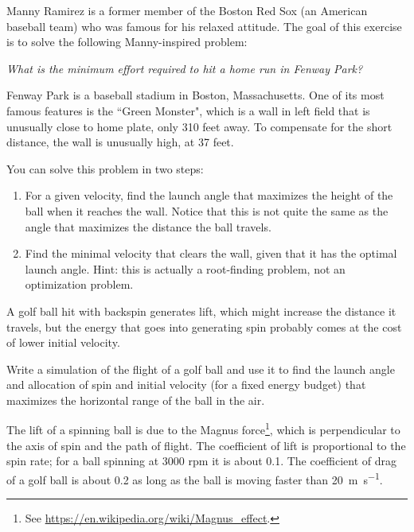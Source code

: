 \documentclass[
]{book}
\numberwithin{Answer}{chapter}
\numberwithin{Exercise}{chapter}
\begin{document}
\begin{ex}


Manny Ramirez is a former member of the Boston Red Sox (an American baseball team) who was famous for his relaxed attitude.  The goal of this exercise is to solve the following Manny-inspired problem:

{\it What is the minimum effort required to hit a home run in Fenway Park?}


Fenway Park is a baseball stadium in Boston, Massachusetts.  One of its most famous features is the ``Green Monster", which is a wall in left field that is unusually close to home plate, only 310 feet away.  To compensate for the short distance, the wall is unusually high, at 37 feet.


You can solve this problem in two steps:

\begin{enumerate}

\item For a given velocity, find the launch angle that maximizes the height of the ball when it reaches the wall.  Notice that this is not quite the same as the angle that maximizes the distance the ball travels.


\item Find the minimal velocity that clears the wall, given that it has the optimal launch angle.  Hint: this is actually a root-finding problem, not an optimization problem.

\end{enumerate}

\end{ex}

\begin{ex}
\label{ex:golf}


A golf ball hit with backspin generates lift, which might increase the distance it travels, but the energy that goes into generating spin probably comes at the cost of lower initial velocity.

Write a simulation of the flight of a golf ball and use it to find
the launch angle and allocation of spin and initial velocity
(for a fixed energy budget) that maximizes the horizontal range of the
ball in the air.

The lift of a spinning ball is due to the Magnus force\footnote{See
\url{https://en.wikipedia.org/wiki/Magnus_effect}.}, which is
perpendicular to the axis of spin and the path of flight.  The
coefficient of lift is proportional to the spin rate; for a ball
spinning at 3000 rpm it is about 0.1.  The coefficient of drag of a
golf ball is about 0.2 as long as the ball is moving faster than \SI{20}{\meter\per\second}.

\end{ex}
\end{document}
